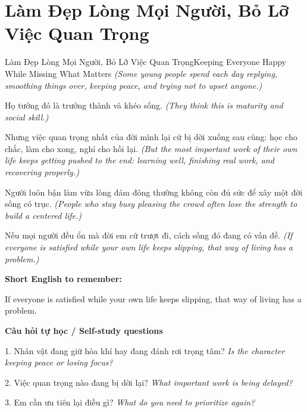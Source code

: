 \section{Làm Đẹp Lòng Mọi Người, Bỏ Lỡ Việc Quan Trọng}
\begin{truyen}{Làm Đẹp Lòng Mọi Người, Bỏ Lỡ Việc Quan Trọng}{Keeping Everyone Happy While Missing What Matters}
\textit{(Some young people spend each day replying, smoothing things over, keeping peace, and trying not to upset anyone.)}

Họ tưởng đó là trưởng thành và khéo sống.
\textit{(They think this is maturity and social skill.)}

Nhưng việc quan trọng nhất của đời mình lại cứ bị dời xuống sau cùng: học cho chắc, làm cho xong, nghỉ cho hồi lại.
\textit{(But the most important work of their own life keeps getting pushed to the end: learning well, finishing real work, and recovering properly.)}

Người luôn bận làm vừa lòng đám đông thường không còn đủ sức để xây một đời sống có trục.
\textit{(People who stay busy pleasing the crowd often lose the strength to build a centered life.)}

\end{truyen}

\begin{baihoc}
Nếu mọi người đều ổn mà đời em cứ trượt đi, cách sống đó đang có vấn đề.
\textit{(If everyone is satisfied while your own life keeps slipping, that way of living has a problem.)}
\end{baihoc}

\begin{ghinhoanh}
\textbf{Short English to remember:}

If everyone is satisfied while your own life keeps slipping, that way of living has a problem.

\end{ghinhoanh}

\begin{tuhocnhanh}
\textbf{Câu hỏi tự học / Self-study questions}

1. Nhân vật đang giữ hòa khí hay đang đánh rơi trọng tâm? \textit{Is the character keeping peace or losing focus?}

2. Việc quan trọng nào đang bị dời lại? \textit{What important work is being delayed?}

3. Em cần ưu tiên lại điều gì? \textit{What do you need to prioritize again?}
\end{tuhocnhanh}
\ngancach

